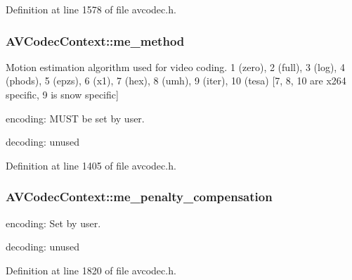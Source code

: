 Definition at line 1578 of file avcodec.\+h.

\subsubsection[{\texorpdfstring{me\+\_\+method}{me_method}}]{ A\+V\+Codec\+Context\+::me\+\_\+method}\hypertarget{struct_a_v_codec_context_ae969fc4cb4ac9ca5c61f7f7c6f78e14d}{}\label{struct_a_v_codec_context_ae969fc4cb4ac9ca5c61f7f7c6f78e14d}
Motion estimation algorithm used for video coding. 1 (zero), 2 (full), 3 (log), 4 (phods), 5 (epzs), 6 (x1), 7 (hex), 8 (umh), 9 (iter), 10 (tesa) \mbox{[}7, 8, 10 are x264 specific, 9 is snow specific\mbox{]}
\begin{DoxyItemize}
\item encoding\+: M\+U\+ST be set by user.
\item decoding\+: unused 
\end{DoxyItemize}

Definition at line 1405 of file avcodec.\+h.

\subsubsection[{\texorpdfstring{me\+\_\+penalty\+\_\+compensation}{me_penalty_compensation}}]{ A\+V\+Codec\+Context\+::me\+\_\+penalty\+\_\+compensation}\hypertarget{struct_a_v_codec_context_a90ce781a285bd3688a501a888d652dbd}{}\label{struct_a_v_codec_context_a90ce781a285bd3688a501a888d652dbd}

\begin{DoxyItemize}
\item encoding\+: Set by user.
\item decoding\+: unused 
\end{DoxyItemize}

Definition at line 1820 of file avcodec.\+h.

